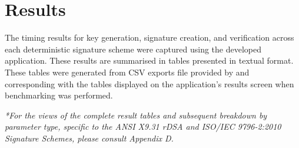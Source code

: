 \documentclass[]{final_report}
\theoremstyle{definition}
\begin{document}

\section{Results}
The timing results for key generation, signature creation, and verification across each deterministic signature scheme were captured using the developed application. These results are summarised in tables presented in textual format. These tables were generated from CSV exports file provided by and corresponding with the tables displayed on the application’s results screen when benchmarking was performed.


\textit{*For the views of the complete result tables and subsequent breakdown by parameter type, specific to the ANSI X9.31 rDSA and ISO/IEC 9796-2:2010 Signature Schemes, please consult Appendix D.} 
\end{document}

